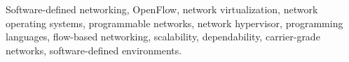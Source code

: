 \documentclass[journal]{IEEEtran}
\begin{document}


\begin{IEEEkeywords}
Software-defined networking, OpenFlow, network virtualization, network operating systems, programmable networks, network hypervisor, programming languages, flow-based networking, scalability, dependability, carrier-grade networks, software-defined environments.
\end{IEEEkeywords}




%
\IEEEpeerreviewmaketitle








%
%
%

%


\end{document}
